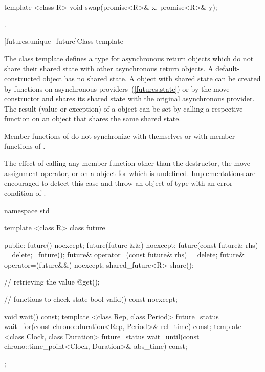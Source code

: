 %
%
\begin{itemdecl}
template <class R>
  void swap(promise<R>& x, promise<R>& y);
\end{itemdecl}

\begin{itemdescr}
\pnum
\effects {}.
\end{itemdescr}

[futures.unique_future]{Class template }

\pnum
The class template  defines a type for asynchronous return objects which
do not share their shared state with other asynchronous return objects.
A default-constructed  object has no
shared state. A  object with shared state can be created by
functions on asynchronous providers~(\ref{futures.state}) or by the move constructor
and shares its shared state with
the original asynchronous provider. The result (value or exception) of
a  object
can be
set by
calling a respective function on an
object that shares the same
shared state.

\pnum
\enternote Member functions of  do not synchronize with themselves or with
member functions of . \exitnote

\pnum
The effect of calling any member function other than the destructor, the
move-assignment operator, or  on a  object for which
is undefined.
\enternote Implementations are encouraged to detect this case and throw an object of type
 with an error condition of . \exitnote

\begin{codeblock}
namespace std {
  template <class R>
  class future {
  public:
    future() noexcept;
    future(future &&) noexcept;
    future(const future& rhs) = delete;
    ~future();
    future& operator=(const future& rhs) = delete;
    future& operator=(future&&) noexcept;
    shared_future<R> share();

    // retrieving the value
    @\seebelow@ get();

    // functions to check state
    bool valid() const noexcept;

    void wait() const;
    template <class Rep, class Period>
      future_status wait_for(const chrono::duration<Rep, Period>& rel_time) const;
    template <class Clock, class Duration>
      future_status wait_until(const chrono::time_point<Clock, Duration>& abs_time) const;
  };
}
\end{codeblock}

